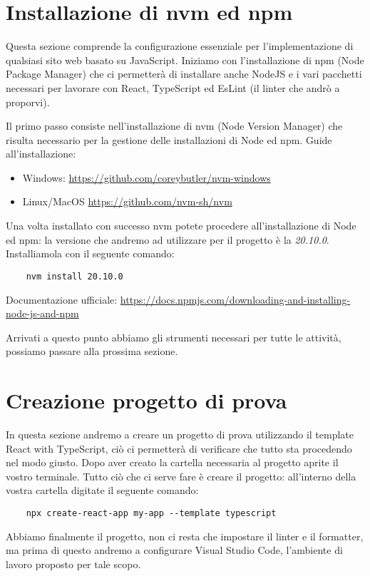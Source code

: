 \section{Installazione di nvm ed npm}
Questa sezione comprende la configurazione essenziale per l'implementazione di
qualsiasi sito web basato su JavaScript. Iniziamo con l'installazione
di npm (Node Package Manager) che ci permetterà di installare anche NodeJS e i vari pacchetti necessari per lavorare con React, TypeScript ed EsLint (il linter che andrò a proporvi).

Il primo passo consiste nell'installazione di nvm (Node Version Manager) che risulta necessario per la gestione delle installazioni di Node ed npm. Guide
all'installazione:
\begin{itemize}
    \item Windows: \url{https://github.com/coreybutler/nvm-windows}
    \item Linux/MacOS \url{https://github.com/nvm-sh/nvm}
\end{itemize}

Una volta installato con successo nvm potete procedere all'installazione di Node ed npm: la versione che andremo ad utilizzare per il progetto è la \textit{20.10.0}. Installiamola con il seguente comando:
\begin{verbatim}
    nvm install 20.10.0
\end{verbatim}
Documentazione ufficiale: \url{https://docs.npmjs.com/downloading-and-installing-node-js-and-npm}

\bigskip

Arrivati a questo punto abbiamo gli strumenti necessari per tutte le attività, possiamo passare alla prossima sezione.

\section{Creazione progetto di prova}
In questa sezione andremo a creare un progetto di prova utilizzando il template React with TypeScript, ciò ci permetterà di verificare che tutto sta procedendo nel modo giusto. Dopo aver creato la cartella necessaria al progetto aprite il vostro terminale. Tutto ciò che ci serve fare è creare il progetto: all'interno della vostra cartella digitate il seguente comando:
\begin{verbatim}
    npx create-react-app my-app --template typescript
\end{verbatim}
Abbiamo finalmente il progetto, non ci resta che impostare il linter e il formatter, ma prima di questo andremo a configurare Visual Studio Code, l'ambiente di lavoro proposto per tale scopo.

